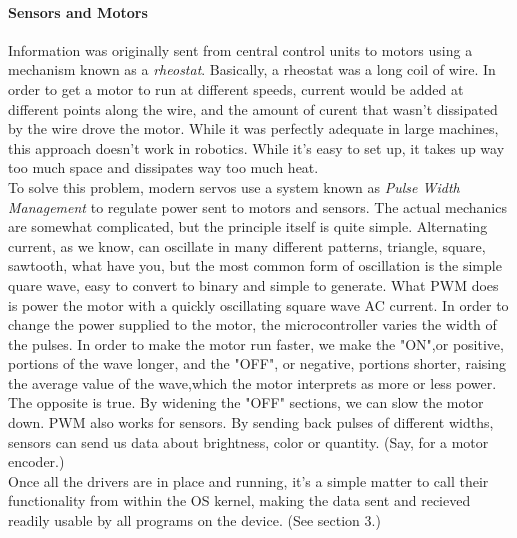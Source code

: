 \documentclass[english]{article}
\begin{document}
\paragraph{Sensors and Motors}
Information was originally sent from central control units to motors using a mechanism known as a {\it rheostat}. Basically, a rheostat was a long coil of wire. In order to get a motor to run at different speeds, current would be added at different points along the wire, and the amount of curent that wasn't dissipated by the wire drove the motor. While it was perfectly adequate in large machines, this approach doesn't work in robotics. While it's easy to set up, it takes up way too much space and dissipates way too much heat. 
\break
\\To solve this problem, modern servos use a system known as {\it Pulse Width Management} to regulate power sent to motors and sensors. The actual mechanics are somewhat complicated, but the principle itself is quite simple. Alternating current, as we know, can oscillate in many different patterns, triangle, square, sawtooth, what have you, but the most common form of oscillation is the simple quare wave, easy to convert to binary and simple to generate. What PWM does is power the motor with a quickly oscillating square wave AC current. In order to change the power supplied to the motor, the microcontroller varies the width of the pulses. In order to make the motor run faster, we make the "ON",or positive, portions of the wave longer, and the "OFF", or negative, portions shorter, raising the average value of the wave,which the motor interprets as more or less power. The opposite is true. By widening the "OFF" sections, we can slow the motor down. PWM also works for sensors. By sending back pulses of different widths, sensors can send us data about brightness, color or quantity. (Say, for a motor encoder.)
\break
\\Once all the drivers are in place and running, it's a simple matter to call their functionality from within the OS kernel, making the data sent and recieved readily usable by all programs on the device. (See section 3.)
\end{document}
